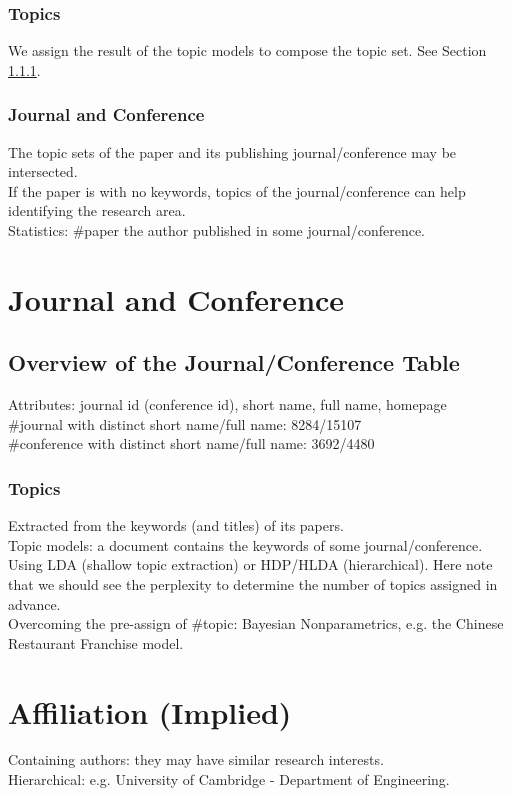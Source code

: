 \documentclass[12pt,a4paper]{article}
\begin{document}
\subsubsection{Topics}
We assign the result of the topic models to compose the topic set. See Section \ref{topic_model}.\\

\subsubsection{Journal and Conference}
The topic sets of the paper and its publishing journal/conference may be intersected.\\
If the paper is with no keywords, topics of the journal/conference can help identifying the research area.\\
Statistics: \#paper the author published in some journal/conference.

\section{Journal and Conference}
\subsection{Overview of the Journal/Conference Table}
Attributes: journal id (conference id), short name, full name, homepage\\
\#journal with distinct short name/full name: 8284/15107\\
\#conference with distinct short name/full name: 3692/4480

\subsubsection{Topics}
\label{topic_model}
Extracted from the keywords (and titles) of its papers.\\
Topic models: a document contains the keywords of some journal/conference.\\
Using LDA (shallow topic extraction) or HDP/HLDA (hierarchical). Here note that we should see the perplexity to determine the number of topics assigned in advance.\\
Overcoming the pre-assign of \#topic: Bayesian Nonparametrics, e.g. the Chinese Restaurant Franchise model.

\section{Affiliation (Implied)}
Containing authors: they may have similar research interests.\\
Hierarchical: e.g. University of Cambridge - Department of Engineering.
\end{document}
